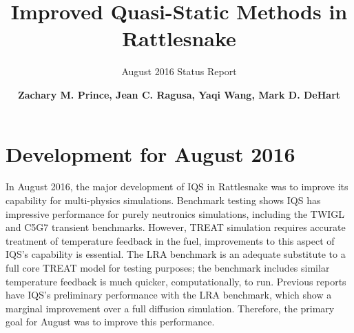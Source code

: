\documentclass[11pt]{scrartcl}
\title{\vspace{-30mm}\Large Improved Quasi-Static Methods in Rattlesnake}
\subtitle{\large August 2016 Status Report}
\author{ \normalsize \textbf{Zachary M. Prince, Jean C. Ragusa, Yaqi Wang, Mark D. DeHart}}
\begin{document}
\maketitle
{}

\section*{\large Development for August 2016}

In August 2016, the major development of IQS in Rattlesnake was to improve its capability for multi-physics simulations.  Benchmark testing shows IQS has impressive performance for purely neutronics simulations, including the TWIGL and C5G7 transient benchmarks.  However, TREAT simulation requires accurate treatment of temperature feedback in the fuel, improvements to this aspect of IQS's capability is essential. The LRA benchmark is an adequate substitute to a full core TREAT model for testing purposes; the benchmark includes similar temperature feedback is much quicker, computationally, to run.  Previous reports have IQS's preliminary performance with the LRA benchmark, which show a marginal improvement over a full diffusion simulation.  Therefore, the primary goal for August was to improve this performance.
\\
\end{document}
